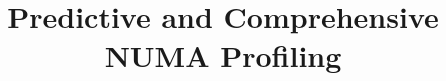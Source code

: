 \documentclass[sigplan,10pt,review,anonymous]{acmart}
\begin{document}
\title{Predictive and Comprehensive NUMA Profiling} 



\maketitle






{


}
\end{document}
